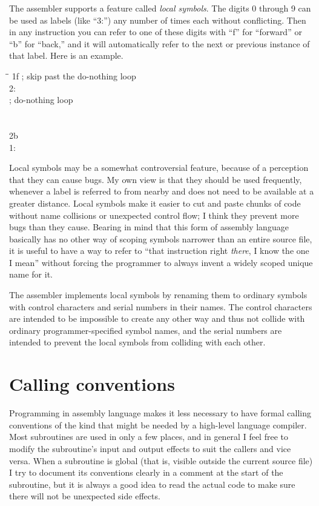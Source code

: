 The assembler supports a feature called \emph{local symbols}.  The digits
0 through 9 can be used as labels (like ``3:'') any number of times each
without conflicting.  Then in any instruction you can refer to one of these
digits with ``f'' for ``forward'' or ``b'' for ``back,'' and it will
automatically refer to the next or previous instance of that label.  Here is
an example.
\begin{tabbing}
\qquad\=\qquad\qquad\=\kill
\>\>1f ; skip past the do-nothing loop\\
2:\\
\>; do-nothing loop\\
\>\\
\>\\
\>\>2b\\
1:\\
\end{tabbing}

Local symbols may be a somewhat controversial feature, because of a
perception that they can cause bugs.  My own view is that they should be
used frequently, whenever a label is referred to from nearby and does not
need to be available at a greater distance.  Local symbols make it easier to
cut and paste chunks of code without name collisions or unexpected control
flow; I think they prevent more bugs than they cause.  Bearing in mind that
this form of assembly language basically has no other way of scoping symbols
narrower than an entire source file, it is useful to have a way to refer to
``that instruction right \emph{there}, I know the one I mean'' without
forcing the programmer to always invent a widely scoped unique name for it.

The assembler implements local symbols by renaming them to ordinary symbols
with control characters and serial numbers in their names.  The control
characters are intended to be impossible to create any other way and thus
not collide with ordinary programmer-specified symbol names, and the serial
numbers are intended to prevent the local symbols from colliding with each
other.

\section{Calling conventions}

Programming in assembly language makes it less necessary to have formal
calling conventions of the kind that might be needed by a high-level
language compiler.  Most subroutines are used in only a few places, and in
general I feel free to modify the subroutine's input and output effects to
suit the callers and vice versa.  When a subroutine is global (that is,
visible outside the current source file) I try to document its conventions
clearly in a comment at the start of the subroutine, but it is always a good
idea to read the actual code to make sure there will not be unexpected side
effects.

